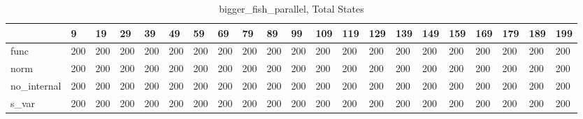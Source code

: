 \begin{table}
\centering
\caption{bigger_fish_parallel, Total States}
\label{bigger_fish_parallel_total}
\begin{tabular}{lllllllllllllllllllll}
\toprule
{} &    9 &   19 &   29 &   39 &   49 &   59 &   69 &   79 &   89 &   99 &  109 &  119 &  129 &  139 &  149 &  159 &  169 &  179 &  189 &  199 \\
\midrule
func        &  200 &  200 &  200 &  200 &  200 &  200 &  200 &  200 &  200 &  200 &  200 &  200 &  200 &  200 &  200 &  200 &  200 &  200 &  200 &  200 \\
norm        &  200 &  200 &  200 &  200 &  200 &  200 &  200 &  200 &  200 &  200 &  200 &  200 &  200 &  200 &  200 &  200 &  200 &  200 &  200 &  200 \\
no\_internal &  200 &  200 &  200 &  200 &  200 &  200 &  200 &  200 &  200 &  200 &  200 &  200 &  200 &  200 &  200 &  200 &  200 &  200 &  200 &  200 \\
s\_var       &  200 &  200 &  200 &  200 &  200 &  200 &  200 &  200 &  200 &  200 &  200 &  200 &  200 &  200 &  200 &  200 &  200 &  200 &  200 &  200 \\
\bottomrule
\end{tabular}
\end{table}

